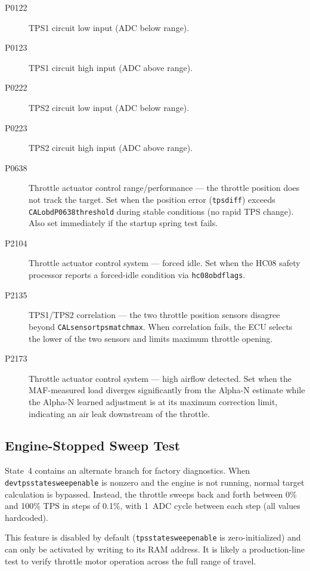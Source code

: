 \documentclass[a4paper,11pt]{article}
\renewcommand{\_}{\oldunderscore\allowbreak}
\begin{document}
\begin{description}
	\item[P0122] TPS1 circuit low input (ADC below range).
	\item[P0123] TPS1 circuit high input (ADC above range).
	\item[P0222] TPS2 circuit low input (ADC below range).
	\item[P0223] TPS2 circuit high input (ADC above range).
	\item[P0638] Throttle actuator control range/performance --- the throttle
	      position does not track the target. Set when the position error
	      (\texttt{tps\_diff}) exceeds
	      \texttt{CAL\_obd\_P0638\_threshold} during stable conditions (no rapid
	      TPS change). Also set immediately if the startup spring test fails.
	\item[P2104] Throttle actuator control system --- forced idle. Set when the
	      HC08 safety processor reports a forced-idle condition via
	      \texttt{hc08\_obd\_flags}.
	\item[P2135] TPS1/TPS2 correlation --- the two throttle position sensors
	      disagree beyond \texttt{CAL\_sensor\_tps\_match\_max}. When
	      correlation fails, the ECU selects the lower of the two sensors and
	      limits maximum throttle opening.
	\item[P2173] Throttle actuator control system --- high airflow detected.
	      Set when the MAF-measured load diverges significantly from the
	      Alpha-N estimate while the Alpha-N learned adjustment is at its
	      maximum correction limit, indicating an air leak downstream of the
	      throttle.
\end{description}

\subsection{Engine-Stopped Sweep Test}

State~4 contains an alternate branch for factory diagnostics. When
\texttt{dev\_tps\_state\_sweep\_enable} is nonzero and the engine is not running,
normal target calculation is bypassed. Instead, the throttle sweeps back and
forth between 0\% and 100\% TPS in steps of 0.1\%, with
1~ADC cycle between each step (all values hardcoded).

This feature is disabled by default (\texttt{tps\_state\_sweep\_enable} is
zero-initialized) and can only be activated by writing to its RAM address.
It is likely a production-line test to verify throttle motor operation across
the full range of travel.
\end{document}
